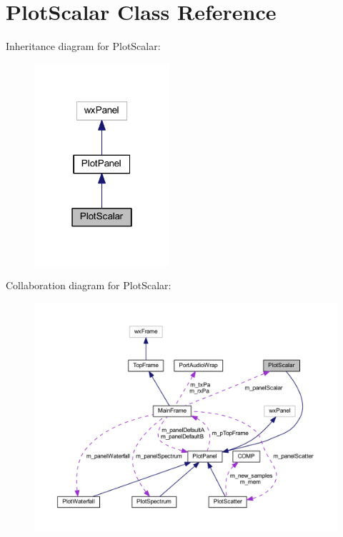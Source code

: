 \hypertarget{class_plot_scalar}{\section{Plot\-Scalar Class Reference}
\label{class_plot_scalar}
}


Inheritance diagram for Plot\-Scalar\-:\nopagebreak
\begin{figure}[H]
\begin{center}
\leavevmode
\includegraphics[width=142pt]{class_plot_scalar__inherit__graph}
\end{center}
\end{figure}


Collaboration diagram for Plot\-Scalar\-:\nopagebreak
\begin{figure}[H]
\begin{center}
\leavevmode
\includegraphics[width=350pt]{class_plot_scalar__coll__graph}
\end{center}
\end{figure}
